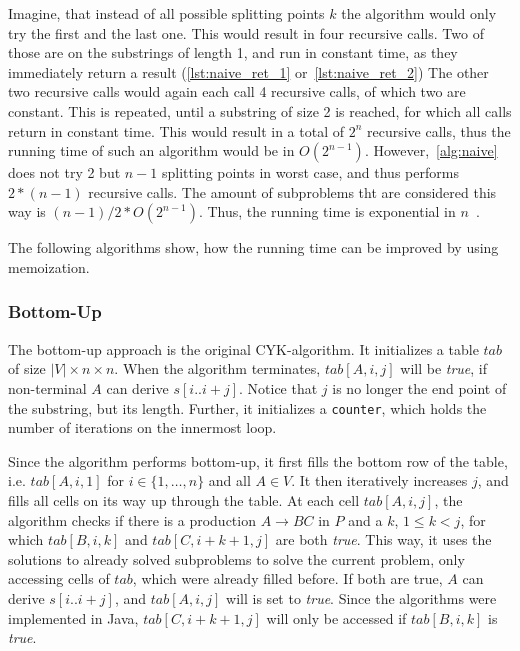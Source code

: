 Imagine, that instead of all possible splitting points $k$ the algorithm would only try the first and the last one.
This would result in four recursive calls.
Two of those are on the substrings of length 1, and run in constant time, as they immediately return a result (\cref{lst:naive_ret_1} or~\cref{lst:naive_ret_2})
The other two recursive calls would again each call 4 recursive calls, of which two are constant.
This is repeated, until a substring of size 2 is reached, for which all calls return in constant time.
This would result in a total of $2^n$ recursive calls, thus the running time of such an algorithm would be in $O(2^{n-1})$.
However,~\cref{alg:naive} does not try 2 but $n-1$ splitting points in worst case, and thus performs $2*(n-1)$ recursive calls.
The amount of subproblems tht are considered this way is $(n-1)/2 * O(2^{n-1})$.
Thus, the running time is exponential in $n$~\cite{automata}.

The following algorithms show, how the running time can be improved by using memoization.


\subsubsection{Bottom-Up}
\label{sec:bottom_up}
The bottom-up approach is the original CYK-algorithm.
It initializes a table $tab$ of size $|V|\times n\times n$.
When the algorithm terminates, $tab[A,i,j]$ will be \textit{true}, if non-terminal $A$ can derive $s[i..i+j]$.
Notice that $j$ is no longer the end point of the substring, but its length.
Further, it initializes a \texttt{counter}, which holds the number of iterations on the innermost loop.

Since the algorithm performs bottom-up, it first fills the bottom row of the table, i.e. $tab[A,i,1]$ for $i\in\{1,\dots,n\}$ and all $A\in V$.
It then iteratively increases $j$, and fills all cells on its way up through the table.
At each cell $tab[A,i,j]$, the algorithm checks if there is a production $A\rightarrow BC$ in $P$ and a $k$, $1 \leq k < j$, for which $tab[B,i,k]$ and $tab[C,i+k+1, j]$ are both \textit{true}.
This way, it uses the solutions to already solved subproblems to solve the current problem, only accessing cells of $tab$, which were already filled before.
If both are true, $A$ can derive $s[i..i+j]$, and $tab[A,i,j]$ will is set to \textit{true}.
Since the algorithms were implemented in Java, $tab[C,i+k+1, j]$ will only be accessed if $tab[B,i,k]$ is \textit{true}.


